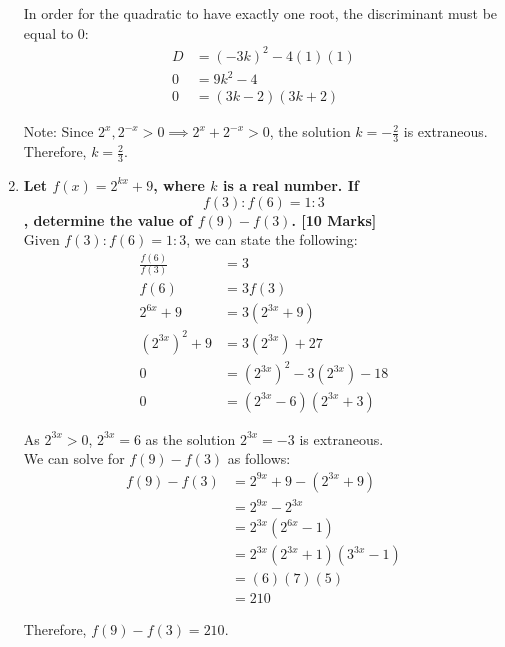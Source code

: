 \documentclass[12pt]{article}
\begin{document}
\begin{enumerate}
    In order for the quadratic to have exactly one root, the discriminant must be equal to $0$:
    \begin{align*}
        D &= (-3k)^2 -4(1)(1) \\
        0 & = 9k^2 -4 \\
        0 & = (3k - 2)(3k + 2)
    \end{align*}
    
    Note: Since $2^x, 2^{-x} > 0 \implies 2^x + 2^{-x} > 0$, the solution $k = -\frac{2}{3}$ is extraneous. \\
    
    Therefore, $k = \frac{2}{3}$.
    
    \item \textbf{Let $f(x) = 2^{kx} + 9$, where $k$ is a real number. If $$f(3):f(6) = 1:3$$, determine the value of $f(9) - f(3)$. [10 Marks]} \\

    Given $f(3):f(6) = 1:3$, we can state the following:
    \begin{align*}
        \frac{f(6)}{f(3)} &= 3 \\
        f(6) &= 3f(3) \\
        2^{6x} + 9 &= 3(2^{3x} + 9) \\
        (2^{3x})^2 + 9 &= 3 (2^{3x}) + 27 \\
        0 &= (2^{3x})^2 - 3(2^{3x}) - 18 \\
        0 &= (2^{3x} - 6)(2^{3x} + 3)
    \end{align*}

    As $2^{3x} > 0$, $2^{3x} = 6$ as the solution $2^{3x} = -3$ is extraneous. \\
    
    We can solve for $f(9) - f(3)$ as follows:
    \begin{align*}
         f(9) - f(3) &= 2^{9x} + 9 - (2^{3x} + 9) \\
          &= 2^{9x} - 2^{3x} \\
          &= 2^{3x}(2^{6x} - 1) \\
          &= 2^{3x}(2^{3x} + 1)(3^{3x} - 1) \\
          &= (6)(7)(5) \\
          &= 210
    \end{align*}

    Therefore, $f(9) - f(3) = 210$.
    
\end{enumerate}
\end{document}
